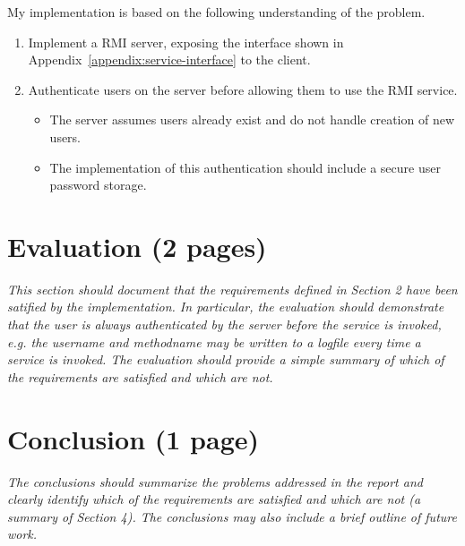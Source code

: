 \documentclass[12pt]{article}
\begin{document}
My implementation is based on the following understanding of the problem.

\begin{enumerate}
    \item Implement a RMI server, exposing the interface shown in Appendix~\ref{appendix:service-interface} to the client.
    \item Authenticate users on the server before allowing them to use the RMI service.
    \begin{itemize}
        \item The server assumes users already exist and do not handle creation of new users.
        \item The implementation of this authentication should include a secure user password storage.
    \end{itemize}
\end{enumerate}


\newpage

\section{Evaluation (2 pages)}
\label{sec:Evaluation}

\textit{This section should document that the requirements defined in Section 2 have been satified by the implementation. In particular, the evaluation should demonstrate that the user is always authenticated by the server before the service is invoked, e.g. the username and methodname may be written to a logfile every time a service is invoked.
The evaluation should provide a simple summary of which of the requirements are satisfied and which are not.}

\newpage

\section{Conclusion (1 page)}
\label{sec:Conclusion}

\textit{The conclusions should summarize the problems addressed in the report and clearly identify which of the requirements are satisfied and which are not (a summary of Section 4). The conclusions may also include a brief outline of future work.}




%
\end{document}
